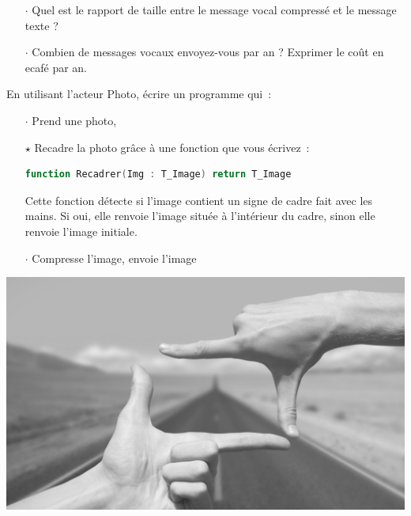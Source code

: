 \begin{itemize}
\item[$\cdot$] Quel est le rapport de taille entre le message vocal compressé et le message texte ?
\item[$\cdot$] Combien de messages vocaux envoyez-vous par an ? Exprimer le coût en ecafé par an.
\end{itemize}






\begin{minipage}[t]{0.74\textwidth}
En utilisant l'acteur Photo, écrire un programme qui~:

\begin{itemize}
\item[$\cdot$] Prend une photo,
\item[$\star$] Recadre la photo grâce à une fonction que vous écrivez~:
  \begin{lstlisting}[language=Ada]
    function Recadrer(Img : T_Image) return T_Image
  \end{lstlisting}
  Cette fonction détecte si l'image contient un signe de cadre fait avec les mains. Si oui, elle renvoie l'image située à l'intérieur du cadre, sinon elle renvoie l'image initiale.

\item[$\cdot$] Compresse l'image, envoie l'image
\end{itemize}
\end{minipage}
\hfill
\begin{minipage}[t]{0.25\textwidth}
\includegraphics[width=\linewidth,valign=t]{frame.png}
\end{minipage}
\medskip

